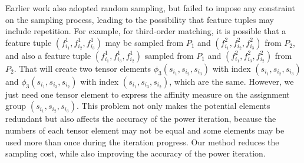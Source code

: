 Earlier work \cite{Duchenne_etal09,Zass08} also adopted random sampling, but failed to impose any constraint on the sampling process,
leading to the possibility that feature tuples may include repetition.
For example, for third-order matching, it is possible that a feature tuple $(f_{i_1}^1, f_{i_2}^1, f_{i_3}^1)$ may be sampled from $P_1$ and $(f_{i_1}^2, f_{i_2}^2, f_{i_3}^2)$ from $P_2$, and also a feature tuple $(f_{i_1}^1, f_{i_3}^1, f_{i_2}^1)$ sampled from $P_1$ and $(f_{i_1}^2, f_{i_3}^2, f_{i_2}^2)$ from $P_2$. That will create two tensor elements $\phi_3(s_{i_1}, s_{i_2}, s_{i_3})$ with index $(s_{i_1}, s_{i_2}, s_{i_3})$ and $\phi_3(s_{i_1}, s_{i_3}, s_{i_2})$ with index $(s_{i_1}, s_{i_3}, s_{i_2})$, which are the same. However, we just need one tensor element to express the affinity measure on the assignment group $(s_{i_1}, s_{i_2}, s_{i_3})$. This problem not only makes the potential elements redundant but also affects the accuracy of the power iteration, because the numbers of each tensor element may not be equal and some elements may be used more than once during the iteration progress.
Our method reduces the sampling cost, while also improving the accuracy of the power iteration.

